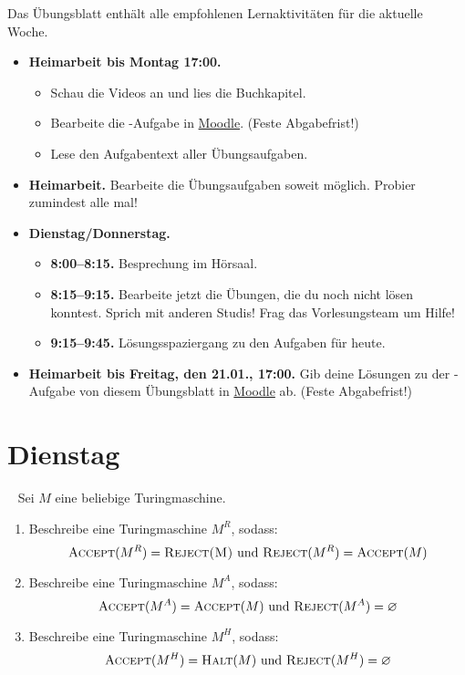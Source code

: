 \documentclass{uebung_cs}
\begin{document}
Das Übungsblatt enthält alle empfohlenen Lernaktivitäten für die aktuelle Woche.

\begin{itemize}
\item \textbf{Heimarbeit bis Montag 17:00.}
    \begin{itemize}
    \item 
    Schau die Videos an und lies die Buchkapitel.
    \item Bearbeite die -Aufgabe in \href{https://moodle.studiumdigitale.uni-frankfurt.de/moodle/course/view.php?id=2241}{Moodle}. (Feste Abgabefrist!)
    \item Lese den Aufgabentext aller Übungsaufgaben.
    \end{itemize}
\item \textbf{Heimarbeit.} Bearbeite die Übungsaufgaben soweit möglich. Probier zumindest alle mal!
\item \textbf{Dienstag/Donnerstag.}
\begin{itemize}
    \item \textbf{8:00--8:15.} Besprechung im Hörsaal.
    \item \textbf{8:15--9:15.} Bearbeite jetzt die Übungen, die du noch nicht lösen konntest. Sprich mit anderen Studis! Frag das Vorlesungsteam um Hilfe!
    \item \textbf{9:15--9:45.} Lösungsspaziergang zu den Aufgaben für heute.
\end{itemize}

\item \textbf{Heimarbeit bis Freitag, den 21.01., 17:00.} Gib deine Lösungen zu der -Aufgabe von diesem Übungsblatt in \href{https://moodle.studiumdigitale.uni-frankfurt.de/moodle/course/view.php?id=2241}{Moodle} ab. (Feste Abgabefrist!)
\end{itemize}

\section*{Dienstag}

\begin{aufgabe}[Turingmaschinen]\
	Sei $M$ eine beliebige Turingmaschine.
	\begin{enumerate}
		\item Beschreibe eine Turingmaschine $M^R$, sodass:
		$$\textsc{Accept}(M^R) = \textsc{Reject(M)} \text{ und } \textsc{Reject}(M^R) = \textsc{Accept}(M)$$
		
		\item Beschreibe eine Turingmaschine $M^A$, sodass:
		$$\textsc{Accept}(M^A) = \textsc{Accept}(M) \text{ und } \textsc{Reject}(M^A) = \varnothing$$
		
		\item Beschreibe eine Turingmaschine $M^H$, sodass:
		$$\textsc{Accept}(M^H) = \textsc{Halt}(M) \text{ und } \textsc{Reject}(M^H) = \varnothing$$
	\end{enumerate}
\end{aufgabe}
\end{document}
